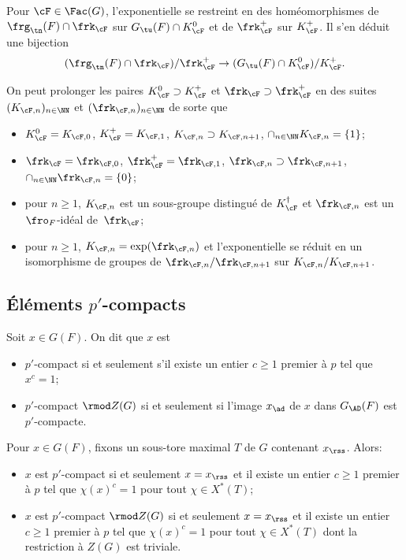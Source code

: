 Pour $\cF\in \Fac(G)$, l'exponentielle se restreint en des homéomorphismes de \hbox{$\frg_{\tn}(F)\cap \frk_{\cF}$} sur $G_{\tu}(F)\cap K_{\cF}^0$
et de $\frk_{\cF}^+$ sur $K_{\cF}^+$. Il s'en déduit une bijection
\[
(\frg_{\tn}(F)\cap \frk_{\cF})/\frk_{\cF}^+\to (G_{\tu}(F)\cap K_{\cF}^0)/K_{\cF}^+.
\]

On peut prolonger les paires $K_{\cF}^0\supset K_{\cF}^+$ et $\frk_{\cF}\supset \frk_{\cF}^+$
en des suites $(K_{\cF,n})_{n\in \NN}$ et $(\frk_{\cF,n})_{n\in \NN}$ de sorte que
\begin{itemize}
\item
$K_{\cF}^0=K_{\cF,0}$, $K_{\cF}^+ =K_{\cF,1}$, $K_{\cF,n}\supset K_{\cF,n+1}$, $\cap_{n\in \NN}K_{\cF,n}=\{1\}$;

\item
$\frk_{\cF}=\frk_{\cF,0}$, $\frk_{\cF}^+ =\frk_{\cF,1}$, $\frk_{\cF,n}\supset \frk_{\cF,n+1}$, $\cap_{n\in \NN}\frk_{\cF,n}=\{0\}$;

\item
pour $n\!\geq\!1$, $K_{\cF,n}$ est un sous-groupe distingué de $K_{\cF}^{\dag}$ et $\frk_{\cF,n}$ est un $\fro_{F}$-idéal de~$\frk_{\cF}$;

\item
pour $n\geq1$, $K_{\cF,n}=\exp(\frk_{\cF,n})$ et l'exponentielle se réduit en un isomorphisme de groupes de $\frk_{\cF,n}/\frk_{\cF,n+1}$ sur $K_{\cF,n}/K_{\cF,n+1}$.
\end{itemize}

\subsection{Éléments \texorpdfstring{$p'$}{p'}-compacts}\label{elementsp}

Soit $x\in G(F)$. On dit que $x$ est
\begin{itemize}
\item
$p'$-compact si et seulement s'il existe un entier $c\geq1$ premier à $p$ tel que $x^c=1$;

\item
$p'$-compact $\rmod Z(G)$ si et seulement si l'image $x_{\ad}$ de $x$ dans $G_{\AD}(F)$ est $p'$-compacte.
\end{itemize}

Pour $x\in G(F)$, fixons un sous-tore maximal $T$ de $G$ contenant $x_{\rss}$. Alors:

\begin{itemize}
\item
$x$ est $p'$-compact si et seulement $x=x_{\rss}$ et il existe un entier $c\geq1$ premier à $p$ tel que $\chi(x)^c=1$ pour tout $\chi\in X^*(T)$;

\item
$x$ est $p'$-compact $\rmod Z(G)$ si et seulement $x=x_{\rss}$ et il existe un entier $c\geq1$ premier à $p$ tel que $\chi(x)^c=1$ pour tout $\chi\in X^*(T)$ dont la restriction à $Z(G)$ est triviale.
\end{itemize}

